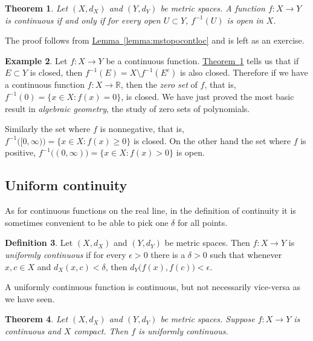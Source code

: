 \documentclass[12pt]{book}
\newcommand{\R}{{\mathbb{R}}}
\newcommand{\myindex}[1]{#1\index{#1}}
\theoremstyle{plain}
\newtheorem{thm}{Theorem}[section]
\theoremstyle{remark}
\theoremstyle{definition}
\newtheorem{defn}[thm]{Definition}
\theoremstyle{exercise}
\theoremstyle{example}
\newtheorem{example}[thm]{Example}
\newcommand{\thmref}[1]{\hyperref[#1]{Theorem~\ref*{#1}}}
\newcommand{\lemmaref}[1]{\hyperref[#1]{Lemma~\ref*{#1}}}
\begin{document}
\begin{thm} \label{thm:mstopocont}
Let $(X,d_X)$ and $(Y,d_Y)$ be metric spaces.  A function $f \colon X \to Y$
is continuous if and only if
for every open $U \subset Y$, $f^{-1}(U)$ is open in $X$.
\end{thm}

The proof follows from \lemmaref{lemma:mstopocontloc} and is left as
an exercise.

\begin{example}
Let $f \colon X \to Y$ be a continuous function.
\thmref{thm:mstopocont} tells us that if $E \subset Y$ is closed, then 
$f^{-1}(E) = X \setminus f^{-1}(E^c)$ is also closed.  Therefore if
we have a continuous
function $f \colon X \to \R$, then the
\emph{\myindex{zero set}} of $f$, that is, 
$f^{-1}(0) = \{ x \in X :
f(x) = 0 \}$, is closed.  We have just proved the most basic result in
\emph{\myindex{algebraic geometry}}, the study of
zero sets of polynomials.

Similarly the set where $f$ is nonnegative, that is,
$f^{-1}\bigl( [0,\infty) \bigr) = \{ x \in X :
f(x) \geq 0 \}$ is closed.  On the other hand the
set where $f$ is positive,
$f^{-1}\bigl( (0,\infty) \bigr) = \{ x \in X :
f(x) > 0 \}$ is open.  
\end{example}

\subsection{Uniform continuity}

As for continuous
functions on the real line, in the definition of continuity
it is sometimes convenient to be able to pick
one $\delta$ for all points.

\begin{defn}
Let $(X,d_X)$ and $(Y,d_Y)$ be metric spaces.
Then $f \colon X \to Y$ is
\emph{uniformly continuous}
if for every $\epsilon > 0$
there is a $\delta > 0$ such that whenever $x,c \in X$ and $d_X(x,c) <
\delta$, then
$d_Y\bigl(f(x),f(c)\bigr) < \epsilon$.
\end{defn}

A uniformly continuous function is continuous, but not necessarily
vice-versa as we have seen.

\begin{thm} \label{thm:Xcompactfunifcont}
Let $(X,d_X)$ and $(Y,d_Y)$ be metric spaces.
Suppose $f \colon X \to Y$ is continuous and $X$ compact.  Then
$f$ is uniformly continuous.
\end{thm}
\end{document}
